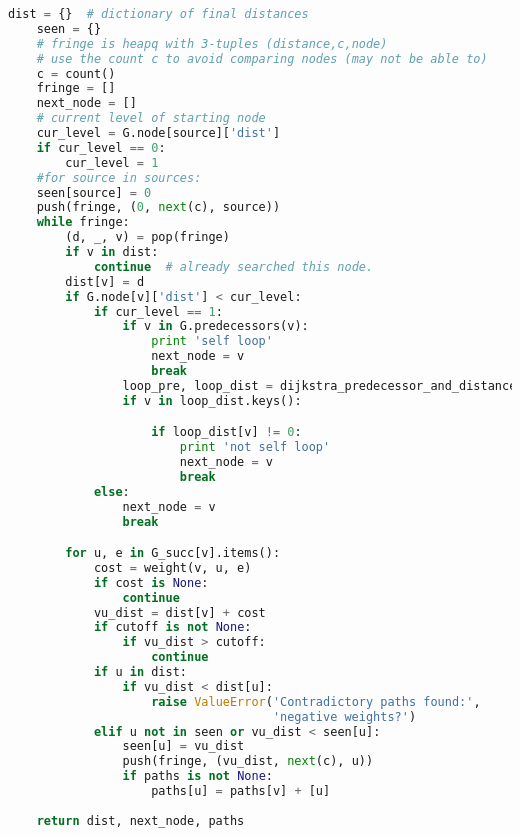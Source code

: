 \begin{lstlisting}[language=Python]
    dist = {}  # dictionary of final distances
    seen = {}
    # fringe is heapq with 3-tuples (distance,c,node)
    # use the count c to avoid comparing nodes (may not be able to)
    c = count()
    fringe = []
    next_node = []
    # current level of starting node
    cur_level = G.node[source]['dist']
    if cur_level == 0:
        cur_level = 1
    #for source in sources:
    seen[source] = 0
    push(fringe, (0, next(c), source))
    while fringe:
        (d, _, v) = pop(fringe)
        if v in dist:
            continue  # already searched this node.
        dist[v] = d
        if G.node[v]['dist'] < cur_level:
            if cur_level == 1:
                if v in G.predecessors(v):
                    print 'self loop'
                    next_node = v
                    break
                loop_pre, loop_dist = dijkstra_predecessor_and_distance(G, v)
                if v in loop_dist.keys():

                    if loop_dist[v] != 0:
                        print 'not self loop'
                        next_node = v
                        break 
            else:
                next_node = v
                break

        for u, e in G_succ[v].items():
            cost = weight(v, u, e)
            if cost is None:
                continue
            vu_dist = dist[v] + cost
            if cutoff is not None:
                if vu_dist > cutoff:
                    continue
            if u in dist:
                if vu_dist < dist[u]:
                    raise ValueError('Contradictory paths found:',
                                     'negative weights?')
            elif u not in seen or vu_dist < seen[u]:
                seen[u] = vu_dist
                push(fringe, (vu_dist, next(c), u))
                if paths is not None:
                    paths[u] = paths[v] + [u]
    
    return dist, next_node, paths
\end{lstlisting}


